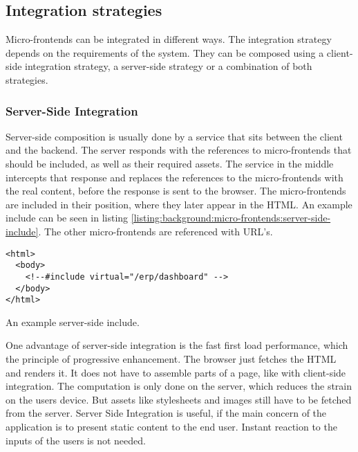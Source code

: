 \subsection{Integration strategies}

Micro-frontends can be integrated in different ways. The integration strategy depends on the requirements of the system. They can be composed using a client-side integration strategy, a server-side strategy or a combination of both strategies.

\subsubsection{Server-Side Integration}

Server-side composition is usually done by a service that sits between the client and the backend. \cite[60]{book:2020:geers:background:micro-frontends:micro-frontends-in-action} The server responds with the references to micro-frontends that should be included, as well as their required assets. The service in the middle intercepts that response and replaces the references to the micro-frontends with the real content, before the response is sent to the browser. The micro-frontends are included in their position, where they later appear in the HTML. An example include can be seen in listing \ref{listing:background:micro-frontends:server-side-include}. The other micro-frontends are referenced with URL's. \cite[61-63]{book:2020:geers:background:micro-frontends:micro-frontends-in-action}

\ifshowListings
\begin{listing}[H]
    \begin{verbatim}
<html>
  <body>
    <!--#include virtual="/erp/dashboard" -->
  </body>
</html>
    \end{verbatim}
    \caption{An example server-side include.}\label{listing:background:micro-frontends:server-side-include}
\end{listing}
\fi

\bigskip

\noindent One advantage of server-side integration is the fast first load performance, which the principle of progressive enhancement. \cite{book:2010:parker:background:micro-frontends:designing-with-progressive-enhancement} The browser just fetches the HTML and renders it. It does not have to assemble parts of a page, like with client-side integration. The computation is only done on the server, which reduces the strain on the users device. \cite{book:2020:geers:background:micro-frontends:micro-frontends-in-action} But assets like stylesheets and images still have to be fetched from the server. Server Side Integration is useful, if the main concern of the application is to present static content to the end user. Instant reaction to the inputs of the users is not needed. \cite[83]{book:2020:geers:background:micro-frontends:micro-frontends-in-action}


